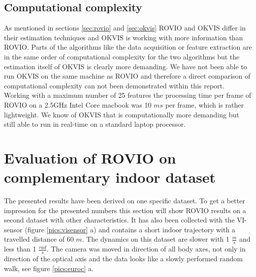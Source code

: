 \subsection{Computational complexity}
\label{sec:ijrr_complexity}

As mentioned in sections \ref{sec:rovio} and \ref{sec:okvis} ROVIO and OKVIS differ in their estimation techniques and OKVIS is working with more information than ROVIO. Parts of the algorithms like the data acquisition or feature extraction are in the same order of computational complexity for the two algorithms but the estimation itself of OKVIS is clearly more demanding. We have not been able to run OKVIS on the same machine as ROVIO and therefore a direct comparison of computational complexity can not been demonstrated within this report. Working with a maximum number of 25 features the processing time per frame of ROVIO on a 2.5GHz Intel Core macbook was 10 $ms$ per frame, which is rather lightweight. We know of OKVIS that is computationally more demanding but still able to run in real-time on a standard laptop processor.


\section{Evaluation of ROVIO on complementary indoor dataset}
\label{sec:euroc}

The presented results have been derived on one specific dataset. To get a better impression for the presented numbers this section will show ROVIO results on a second dataset with other characteristics. It has also been collected with the VI-sensor (figure \ref{pics:visensor} a) and contains a short indoor trajectory with a travelled distance of 60 $m$. The dynamics on this dataset are slower with 1 $\frac{m}{s}$ and less than 1 $\frac{rad}{s}$. The camera was moved in direction of all body axes, not only in direction of the optical axis and the data looks like a slowly performed random walk, see figure \ref{pics:euroc} a. \\

